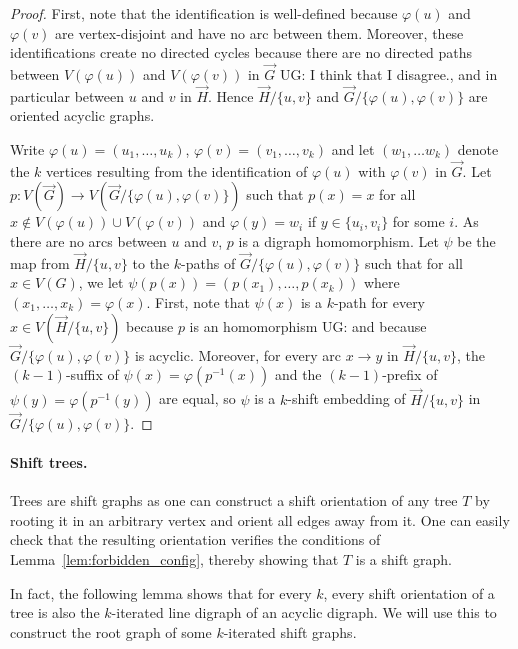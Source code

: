 \documentclass[11pt,a4aper]{article}
\DeclareRobustCommand*{\ora}{\overrightarrow}
\renewcommand{\phi}{\varphi}
\newcommand*{\orG}{\ora{G}}
\newcommand*{\orH}{\ora{H}}
\newcommand{\ugo}[1]{{\color{red} UG: #1}}
\begin{document}
\begin{proof}
  First, note that the identification is well-defined because $\phi(u)$ and
  $\phi(v)$ are vertex-disjoint and have no arc between them. Moreover, these
  identifications create no directed cycles because there are no directed paths
  between $V(\phi(u))$ and $V(\phi(v))$ in $\orG$ \ugo{I think that I disagree.}, and in particular between $u$
  and $v$ in $\orH$. Hence $\orH/\{u,v\}$ and $\orG/\{\phi(u),\phi(v)\}$ are
  oriented acyclic graphs. 


  Write $\phi(u) = (u_1, \dots, u_k)$, $\phi(v) = (v_1, \dots, v_k)$ and let
  $(w_1, \dots w_k)$ denote the $k$ vertices resulting from the identification of
  $\phi(u)$ with $\phi(v)$ in $\orG$. Let
  $p: V(\orG) \to V(\orG/\{\phi(u),\phi(v)\})$ such that $p(x) =x$ for all
  $x \notin V(\phi(u)) \cup V(\phi(v))$ and $\phi(y) = w_i$ if
  $y \in \{u_i,v_i\}$ for some $i$. As there are no arcs between $u$ and $v$, $p$ is a digraph homomorphism.
  Let $\psi$ be the map from $\orH/\{u,v\}$ to the $k$-paths of
  $\orG/\{\phi(u),\phi(v)\}$ such that for all $x \in V(G)$, we let
  $\psi(p(x)) = (p(x_1), \dots, p(x_k))$ where $(x_1, \dots, x_k) =
  \phi(x)$. First, note that $\psi(x)$ is a $k$-path for every
  $x \in V(\orH/\{u,v\})$ because $p$ is an homomorphism \ugo{and because $\orG/\{\phi(u),\phi(v)\}$ is acyclic}. Moreover, for every arc $x
  \to y$
  in $\orH/\{u,v\}$, the $(k-1)$-suffix of $\psi(x) = \phi(p^{-1}(x))$ and the
  $(k-1)$-prefix of $\psi(y) = \phi(p^{-1}(y))$ are equal, so $\psi$ is a
  $k$-shift embedding of $\orH/\{u,v\}$ in $\orG/\{\phi(u),\phi(v)\}$.
\end{proof}


\paragraph{Shift trees.} Trees are shift graphs as one can construct a shift
orientation of any tree $T$
by rooting it in an arbitrary vertex and orient all edges away from it. One can
easily check that the resulting orientation verifies the conditions of
Lemma~\ref{lem:forbidden_config}, thereby showing that $T$ is a shift graph.

In fact, the following lemma shows that for every $k$, every shift orientation
of a tree is also the $k$-iterated line digraph of an acyclic digraph. We will
use this to construct the root graph of some $k$-iterated shift graphs.
\end{document}
